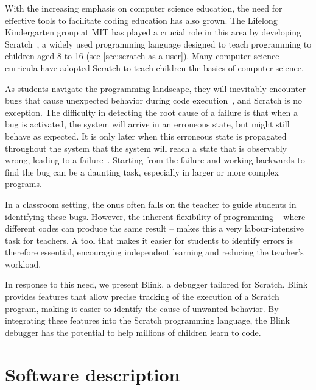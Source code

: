 \documentclass[../main]{subfiles}
\begin{document}
With the increasing emphasis on computer science education, the need for effective tools to facilitate coding education has also grown.
The Lifelong Kindergarten group at MIT has played a crucial role in this area by developing Scratch~\autocite{resnickScratchProgrammingAll2009}, a widely used programming language designed to teach programming to children aged 8 to 16 (see \vref{sec:scratch-as-a-user}).
Many computer science curricula have adopted Scratch to teach children the basics of computer science.

As students navigate the programming landscape, they will inevitably encounter bugs that cause unexpected behavior during code execution~\autocite{zellerWhyProgramsFail2009a}, and Scratch is no exception.
The difficulty in detecting the root cause of a failure is that when a bug is activated, the system will arrive in an erroneous state, but might still behave as expected.
It is only later when this erroneous state is propagated throughout the system that the system will reach a state that is observably wrong, leading to a failure~\autocite{ammannIntroductionSoftwareTesting2016}.
Starting from the failure and working backwards to find the bug can be a daunting task, especially in larger or more complex programs.

In a classroom setting, the onus often falls on the teacher to guide students in identifying these bugs.
However, the inherent flexibility of programming -- where different codes can produce the same result -- makes this a very labour-intensive task for teachers.
A tool that makes it easier for students to identify errors is therefore essential, encouraging independent learning and reducing the teacher's workload.

In response to this need, we present Blink, a debugger tailored for Scratch.
Blink provides features that allow precise tracking of the execution of a Scratch program, making it easier to identify the cause of unwanted behavior.
By integrating these features into the Scratch programming language, the Blink debugger has the potential to help millions of children learn to code.

\section{Software description}\label{sec:blink-software-description}
\end{document}
